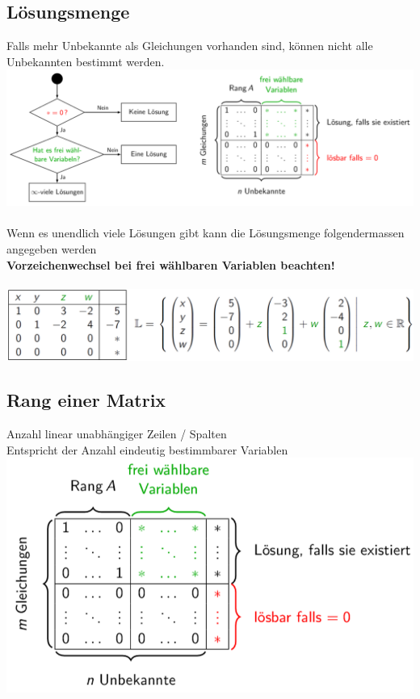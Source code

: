 		    
		    \subsection{Lösungsmenge}
		    	Falls mehr Unbekannte als Gleichungen vorhanden sind, können nicht alle Unbekannten bestimmt werden. \\
		    	

		 	\includegraphics[width=0.9\linewidth]{Bilder/entscheidungsbaum} 	\\
			 \\
			 Wenn es unendlich viele Lösungen gibt kann die Lösungsmenge folgendermassen angegeben werden \\
			 \textbf{Vorzeichenwechsel bei frei wählbaren Variablen beachten!}\\
			 \\
			  \includegraphics[width=0.9\linewidth]{Bilder/loesungsmenge-gauss-tableau} \\
				  
		    
		    \subsection{Rang einer Matrix}
			Anzahl linear unabhängiger Zeilen / Spalten \\		    
		    Entspricht der Anzahl eindeutig bestimmbarer Variablen \\
		    
		    \includegraphics[width=0.7\linewidth]{Bilder/loesungsmenge-gauss}
		    
